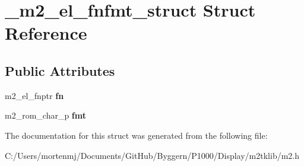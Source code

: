 \hypertarget{struct__m2__el__fnfmt__struct}{\section{\-\_\-m2\-\_\-el\-\_\-fnfmt\-\_\-struct Struct Reference}
\label{struct__m2__el__fnfmt__struct}
}
\subsection*{Public Attributes}
\begin{DoxyCompactItemize}
\item 
\hypertarget{struct__m2__el__fnfmt__struct_af647c1a078e2b99e5863c6af29136e15}{m2\-\_\-el\-\_\-fnptr {\bfseries fn}}\label{struct__m2__el__fnfmt__struct_af647c1a078e2b99e5863c6af29136e15}

\item 
\hypertarget{struct__m2__el__fnfmt__struct_a9ab77049d0fa1c890c1d1af7c7cd265d}{m2\-\_\-rom\-\_\-char\-\_\-p {\bfseries fmt}}\label{struct__m2__el__fnfmt__struct_a9ab77049d0fa1c890c1d1af7c7cd265d}

\end{DoxyCompactItemize}


The documentation for this struct was generated from the following file\-:\begin{DoxyCompactItemize}
\item 
C\-:/\-Users/mortenmj/\-Documents/\-Git\-Hub/\-Byggern/\-P1000/\-Display/m2tklib/m2.\-h\end{DoxyCompactItemize}
